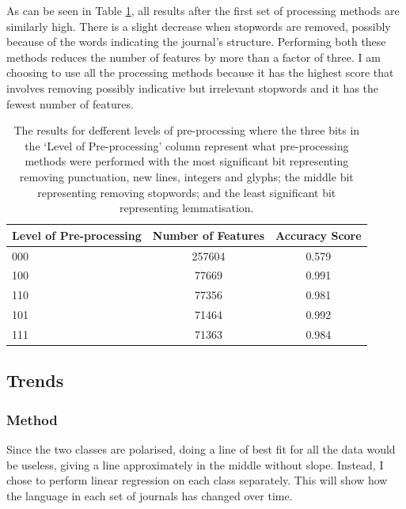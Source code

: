 				As can be seen in Table \ref{tab:ppres}, all results after the first set of processing methods are similarly high. There is a slight decrease when stopwords are removed, possibly because of the words indicating the journal's structure. Performing both these methods reduces the number of features by more than a factor of three. I am choosing to use all the processing methods because it has the highest score that involves removing possibly indicative but irrelevant stopwords and it has the fewest number of features.
				\begin{table}[h]
					\centering
					\begin{tabular}{l|c|c}
						\hline
						Level of Pre-processing&Number of Features&Accuracy Score\\
						\hline
						000&257604&0.579\\
						100&77669&0.991\\
						110&77356&0.981\\
						101&71464&0.992\\
						111&71363&0.984
					\end{tabular}
					\caption{The results for defferent levels of pre-processing where the three bits in the `Level of Pre-processing' column represent what pre-processing methods were performed with the most significant bit representing removing punctuation, new lines, integers and glyphs; the middle bit representing removing stopwords; and the least significant bit representing lemmatisation.}\label{tab:ppres}
				\end{table}
				
		\subsection{Trends}\label{sec:trends}
			\subsubsection{Method}
				Since the two classes are polarised, doing a line of best fit for all the data would be useless, giving a line approximately in the middle without slope. Instead, I chose to perform linear regression on each class separately. This will show how the language in each set of journals has changed over time.		
			

